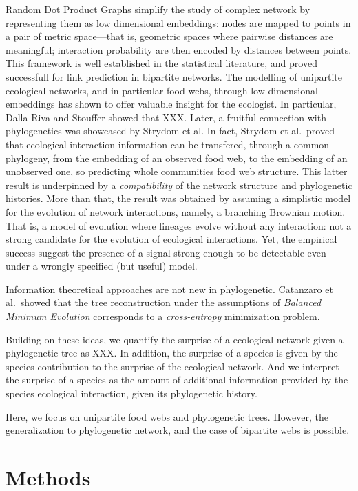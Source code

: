\documentclass[11pt]{article}
\begin{document}
Random Dot Product Graphs simplify the study of complex network by
representing them as low dimensional embeddings: nodes are mapped to
points in a pair of metric space---that is, geometric spaces where
pairwise distances are meaningful; interaction probability are then
encoded by distances between points. This framework is well established
in the statistical literature, and proved successfull for link
prediction in bipartite networks. The modelling of unipartite ecological
networks, and in particular food webs, through low dimensional
embeddings has shown to offer valuable insight for the ecologist. In
particular, Dalla Riva and Stouffer showed that XXX. Later, a fruitful
connection with phylogenetics was showcased by Strydom et al. In fact,
Strydom et al.~proved that ecological interaction information can be
transfered, through a common phylogeny, from the embedding of an
observed food web, to the embedding of an unobserved one, so predicting
whole communities food web structure. This latter result is underpinned
by a \emph{compatibility} of the network structure and phylogenetic
histories. More than that, the result was obtained by assuming a
simplistic model for the evolution of network interactions, namely, a
branching Brownian motion. That is, a model of evolution where lineages
evolve without any interaction: not a strong candidate for the evolution
of ecological interactions. Yet, the empirical success suggest the
presence of a signal strong enough to be detectable even under a wrongly
specified (but useful) model.

Information theoretical approaches are not new in phylogenetic.
Catanzaro et al.~showed that the tree reconstruction under the
assumptions of \emph{Balanced Minimum Evolution} corresponds to a
\emph{cross-entropy} minimization problem.

Building on these ideas, we quantify the surprise of a ecological
network given a phylogenetic tree as XXX. In addition, the surprise of a
species is given by the species contribution to the surprise of the
ecological network. And we interpret the surprise of a species as the
amount of additional information provided by the species ecological
interaction, given its phylogenetic history.

Here, we focus on unipartite food webs and phylogenetic trees. However,
the generalization to phylogenetic network, and the case of bipartite
webs is possible.

\hypertarget{methods}{%
\section{Methods}\label{methods}}
\end{document}

